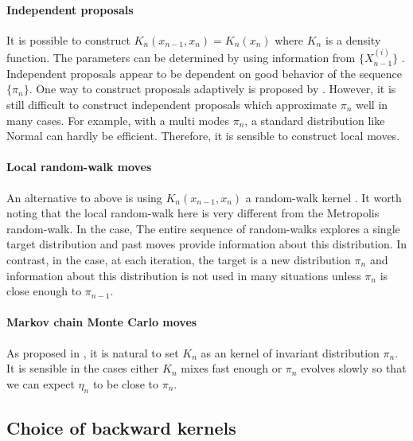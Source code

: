 \paragraph{Independent proposals} It is possible to construct
$K_n(x_{n-1},x_n) = K_n(x_n)$ where $K_n$ is a density function. The
parameters can be determined by using information from $\{X_{n-1}^{(i)}\}$
\parencite[e.g.][]{West1993}. Independent proposals appear to be dependent on
good behavior of the sequence $\{\pi_n\}$. One way to construct proposals
adaptively is proposed by \textcite{Jasra2008}. However, it is still difficult
to construct independent proposals which approximate $\pi_n$ well in many
cases. For example, with a multi modes $\pi_n$, a standard distribution like
Normal can hardly be efficient. Therefore, it is sensible to construct local
moves.

\paragraph{Local random-walk moves} An alternative to above is using
$K_n(x_{n-1},x_n)$ a random-walk kernel \parencite[e.g.][]{Givens1996}.  It
worth noting that the local random-walk here is very different from the
Metropolis random-walk. In the \mcmc case, The entire sequence of random-walks
explores a single target distribution and past moves provide information about
this distribution. In contrast, in the \smc case, at each iteration, the
target is a new distribution $\pi_n$ and information about this distribution
is not used in many situations unless $\pi_n$ is close enough to $\pi_{n-1}$.

\paragraph{Markov chain Monte Carlo moves} As proposed in
\textcite{DelMoral2006}, it is natural to set $K_n$ as an \mcmc kernel of
invariant distribution $\pi_n$. It is sensible in the cases either $K_n$
mixes fast enough or $\pi_n$ evolves slowly so that we can expect $\eta_n$
to be close to $\pi_n$.

\subsection{Choice of backward kernels}
\label{sub:Choice of backward kernels}

